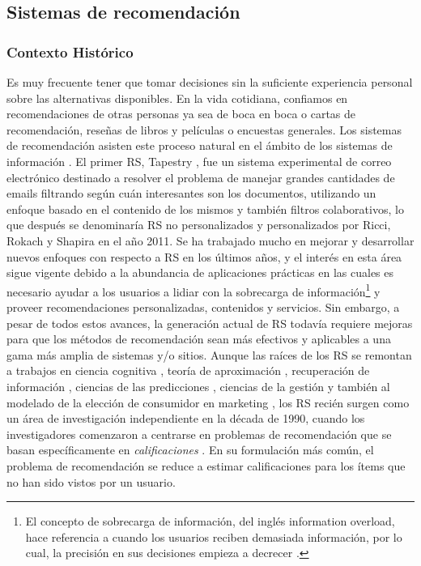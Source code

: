 \subsection{Sistemas de recomendación}
\subsubsection{Contexto Histórico}
Es muy frecuente tener que tomar decisiones sin la suficiente experiencia personal sobre las alternativas disponibles. En la vida cotidiana, confiamos en recomendaciones de otras personas ya sea de boca en boca o cartas de recomendación, reseñas de libros y películas o encuestas generales. Los sistemas de recomendación asisten este proceso natural en el ámbito de los sistemas de información \citep{resnick1997recommender}. El primer RS, Tapestry \citep{goldberg1992using}, fue un sistema experimental de correo electrónico destinado a resolver el problema de manejar grandes cantidades de emails filtrando según cuán interesantes son los documentos, utilizando un enfoque basado en el contenido de los mismos y también filtros colaborativos, lo que después se denominaría RS no personalizados y personalizados por Ricci, Rokach y Shapira en el año 2011. Se ha trabajado mucho en mejorar y desarrollar nuevos enfoques con respecto a RS en los últimos años, y el interés en esta área sigue vigente debido a la abundancia de aplicaciones prácticas en las cuales es necesario ayudar a los usuarios a lidiar con la sobrecarga de información\footnote{El concepto de sobrecarga de información, del inglés information overload, hace referencia a cuando los usuarios reciben demasiada información, por lo cual, la precisión en sus decisiones empieza a decrecer \citep{eppler2004concept}.} y proveer recomendaciones personalizadas, contenidos y servicios. Sin embargo, a pesar de todos estos avances, la generación actual de RS todavía requiere mejoras para que los métodos de recomendación sean más efectivos y aplicables a una gama más amplia de sistemas y/o sitios. Aunque las raíces de los RS se remontan a trabajos en ciencia cognitiva \citep{rich1979user}, teoría de aproximación \citep{powell1981approximation}, recuperación de información \citep{salton1989automatic}, ciencias de las predicciones \citep{armstrong2001principles}, ciencias de la gestión \citep{murthi2003role} y también al modelado de la elección de consumidor en marketing \citep{lilien1992marketing}, los RS recién surgen como un área de investigación independiente en la década de 1990, cuando los investigadores comenzaron a centrarse en problemas de recomendación que se basan específicamente en \textit{calificaciones} \citep{adomavicius2005toward}. En su formulación más común, el problema de recomendación se reduce a estimar calificaciones para los ítems que no han sido vistos por un usuario.


